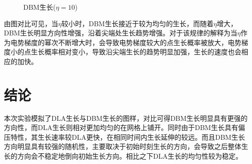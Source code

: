 \documentclass{article}
\begin{document}
\begin{figure}[!h]
	\caption{\heiti{}DBM生长($ \eta=10 $)}
	\label{fig:5}
\end{figure}
由图对比可见，当$ \eta $较小时，DBM生长接近于较为均匀的生长，而随着$  \eta $增大，DBM生长明显方向性增强，沿着尖端处生长趋势增强。对于该规律的解释为当$ \eta $作为电势梯度的幂次不断增大时，会导致电势梯度较大的点生长概率被放大，电势梯度小的点生长概率相对变小，导致沿尖端生长的趋势明显加强，生长的速度也会相应的加快。
	\section{结论}
本次实验模拟了DLA生长与DBM生长的图样，对比可得DBM生长明显具有更强的方向性，而DLA生长则相对更加均匀的在网格上铺开。同时由于DBM生长具有偏压特性，其生长速率较DLA更快，在相同时间内生长延伸的较远。而且DBM生长方向明显具有较强的随机性，主要取决于初始时刻生长的方向，会导致之后整体生长的方向会不稳定地倒向初始生长方向。相比之下DLA生长的均匀性较为稳定。
\end{document}
